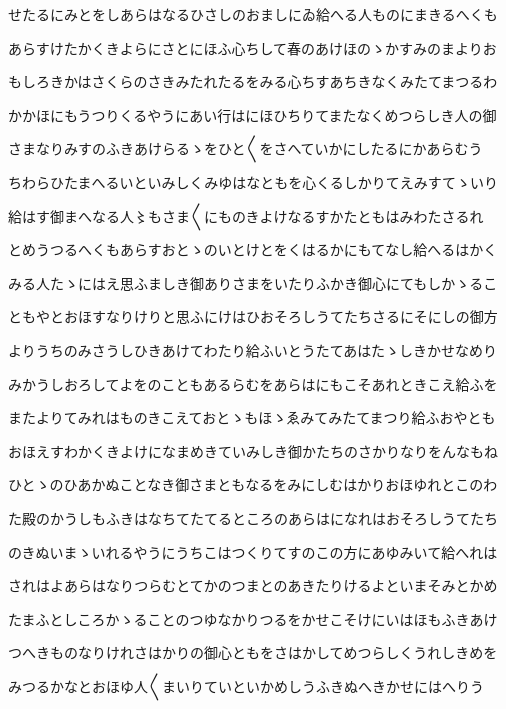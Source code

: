 \documentclass[a4paper,11pt,landscape]{ltjtarticle}
\begin{document}
\par\medskip
せたるにみとをしあらはなるひさしのおましにゐ給へる人ものにまきるへくも
\par\medskip
あらすけたかくきよらにさとにほふ心ちして春のあけほのゝかすみのまよりお
\par\medskip
もしろきかはさくらのさきみたれたるをみる心ちすあちきなくみたてまつるわ
\par\medskip
かかほにもうつりくるやうにあい行はにほひちりてまたなくめつらしき人の御
\par\medskip
さまなりみすのふきあけらるゝをひと〱をさへていかにしたるにかあらむう
\par\medskip
ちわらひたまへるいといみしくみゆはなともを心くるしかりてえみすてゝいり
\par\medskip
給はす御まへなる人〻もさま〱にものきよけなるすかたともはみわたさるれ
\par\medskip
とめうつるへくもあらすおとゝのいとけとをくはるかにもてなし給へるはかく
\par\medskip
みる人たゝにはえ思ふましき御ありさまをいたりふかき御心にてもしかゝるこ
\par\medskip
ともやとおほすなりけりと思ふにけはひおそろしうてたちさるにそにしの御方
\par\medskip
よりうちのみさうしひきあけてわたり給ふいとうたてあはたゝしきかせなめり
\par\medskip
みかうしおろしてよをのこともあるらむをあらはにもこそあれときこえ給ふを
\par\medskip
またよりてみれはものきこえておとゝもほゝゑみてみたてまつり給ふおやとも
\par\medskip
おほえすわかくきよけになまめきていみしき御かたちのさかりなりをんなもね
\par\medskip
ひとゝのひあかぬことなき御さまともなるをみにしむはかりおほゆれとこのわ
\par\medskip
た殿のかうしもふきはなちてたてるところのあらはになれはおそろしうてたち
\par\medskip
のきぬいまゝいれるやうにうちこはつくりてすのこの方にあゆみいて給へれは
\par\medskip
されはよあらはなりつらむとてかのつまとのあきたりけるよといまそみとかめ
\par\medskip
たまふとしころかゝることのつゆなかりつるをかせこそけにいはほもふきあけ
\par\medskip
つへきものなりけれさはかりの御心ともをさはかしてめつらしくうれしきめを
\par\medskip
みつるかなとおほゆ人〱まいりていといかめしうふきぬへきかせにはへりう
\par\medskip
\end{document}
